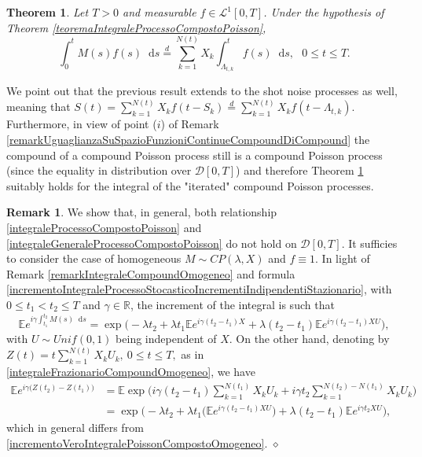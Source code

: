 \documentclass[12pt, twoside, english, headsepline]{article}
\newcommand*\dif{\mathop{}\!\mathrm{d}}  %
\newtheorem{theorem}{Theorem}[section] %
\theoremstyle{definition} %
\newtheorem{remark}{Remark}[section] %
\numberwithin{equation}{section} %
\begin{document}
\begin{theorem}\label{teoremaIntegraleProcessoCompostoPoissonGenerale}
	Let $T>0$ and measurable $f\in \mathcal{L}^1[0,T]$. Under the hypothesis of Theorem \ref{teoremaIntegraleProcessoCompostoPoisson}, 
	\begin{equation}\label{integraleGeneraleProcessoCompostoPoisson}
		\int_0^t  M(s)f(s)\dif s \stackrel{d}{=} \sum_{k=1}^{N(t)} X_k\int_{\Lambda_{t,k}}^t f(s)\dif s,\ \ \ 0\le t \le T.
	\end{equation}	
\end{theorem}

We point out that the previous result extends to the shot noise processes as well, meaning that $S(t) = \sum_{k=1}^{N(t)} X_k f(t-S_k) \stackrel{d}{=} \sum_{k=1}^{N(t)} X_k f(t-\Lambda_{t,k})$. Furthermore, in view of point ($i$) of Remark \ref{remarkUguaglianzaSuSpazioFunzioniContinueCompoundDiCompound} the compound of a compound Poisson process still is a compound Poisson process (since the equality in distribution over $\mathcal{D}[0,T]$) and therefore Theorem \ref{teoremaIntegraleProcessoCompostoPoissonGenerale} suitably holds for the integral of the "iterated" compound Poisson processes.

\begin{remark}
	We show that, in general, both relationship \eqref{integraleProcessoCompostoPoisson} and \eqref{integraleGeneraleProcessoCompostoPoisson} do not hold on $\mathcal{D}[0,T]$. It sufficies to consider the case of homogeneous $M\sim CP(\lambda, X)$ and $f\equiv 1$. In light of Remark \ref{remarkIntegraleCompoundOmogeneo} and formula  \eqref{incrementoIntegraleProcessoStocasticoIncrementiIndipendentiStazionario}, with $0\le t_1<t_2\le T$ and $\gamma \in\mathbb{R}$, the increment of the integral is such that
	\begin{equation}\label{incrementoVeroIntegralePoissonCompostoOmogeneo}
		\mathbb{E}e^{i\gamma \int_{t_1}^{t_2} M(s)\dif s} = \exp\Big(-\lambda t_2 + \lambda t_1 \mathbb{E} e^{i\gamma (t_2-t_1)X} +\lambda(t_2 -t_1)\mathbb{E}e^{i\gamma (t_2-t_1) XU}  \Big),
	\end{equation}
	with $U\sim Unif(0,1)$ being independent of $X$. On the other hand, denoting by $Z(t) = t\sum_{k=1}^{N(t)} X_k U_k, \ 0\le t\le T,$ as in \eqref{integraleFrazionarioCompoundOmogeneo}, we have 
	\begin{align}
		\mathbb{E}e^{i\gamma \big(Z(t_2)-Z(t_1)\big) } & = \mathbb{E} \exp\Bigg(i\gamma (t_2-t_1)\sum_{k=1}^{N(t_1)}X_kU_k + i\gamma t_2 \sum_{k=1}^{N(t_2)-N(t_1)} X_kU_k  \Bigg) \nonumber\\
		& = \exp\Bigg( -\lambda t_2 +\lambda t_1\Big( \mathbb{E}e^{i\gamma (t_2-t_1)XU}\big)+\lambda(t_2 -t_1)\mathbb{E}e^{i\gamma t_2 XU} \Bigg), \nonumber %
	\end{align}
	which in general differs from \eqref{incrementoVeroIntegralePoissonCompostoOmogeneo}. \hfill$\diamond$
\end{remark}
\end{document}
